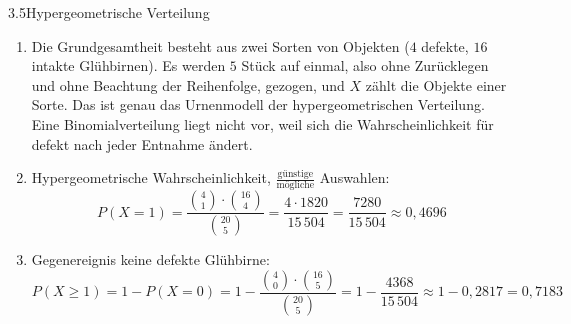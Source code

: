 \begin{loesung}{3.5}{Hypergeometrische Verteilung}
\begin{enumerate}[label=\alph*)]
  \item Die Grundgesamtheit besteht aus zwei Sorten von Objekten ($4$ defekte, $16$ intakte Glühbirnen). Es werden $5$ Stück auf einmal, also ohne Zurücklegen und ohne Beachtung der Reihenfolge, gezogen, und $X$ zählt die Objekte einer Sorte. Das ist genau das Urnenmodell der hypergeometrischen Verteilung. Eine Binomialverteilung liegt nicht vor, weil sich die Wahrscheinlichkeit für \glqq defekt\grqq{} nach jeder Entnahme ändert.
  \item Hypergeometrische Wahrscheinlichkeit, $\frac{\text{günstige}}{\text{mögliche}}$ Auswahlen:
  \[P(X=1) = \dfrac{\binom{4}{1}\cdot\binom{16}{4}}{\binom{20}{5}} = \dfrac{4\cdot 1820}{15\,504} = \dfrac{7280}{15\,504}\approx 0{,}4696\]
  \item Gegenereignis \glqq keine defekte Glühbirne\grqq:
  \[P(X\geq 1) = 1-P(X=0) = 1-\dfrac{\binom{4}{0}\cdot\binom{16}{5}}{\binom{20}{5}} = 1-\dfrac{4368}{15\,504}\approx 1-0{,}2817 = 0{,}7183\]
\end{enumerate}
\end{loesung}


